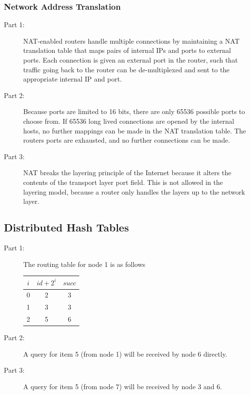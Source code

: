 \subsubsection{Network Address Translation}
\begin{description}
    \item[Part 1:] NAT-enabled routers handle multiple connections by maintaining a NAT translation
        table that maps pairs of internal IPs and ports to external ports. Each connection is given
        an external port in the router, such that traffic going back to the router can be de-multiplexed
        and sent to the appropriate internal IP and port.
    \item[Part 2:] Because ports are limited to 16 bits, there are only 65536 possible ports to choose from.
        If 65536 long lived connections are opened by the internal hosts, no further mappings can be made in
        the NAT translation table. The routers ports are exhausted, and no further connections can be made.
    \item[Part 3:] NAT breaks the layering principle of the Internet because it alters the contents of the
        transport layer port field. This is not allowed in the layering model, because a router only handles
        the layers up to the network layer.
\end{description}

\subsection{Distributed Hash Tables}
\begin{description}
    \item[Part 1:] The routing table for node 1 is as follows\\
        \begin{tabular}{|c|c|c|}
            \hline
            $i$ & $id + 2^{i}$ & $succ$ \\ \hline
            0 & 2 & 3 \\ \hline
            1 & 3 & 3 \\ \hline
            2 & 5 & 6 \\
            \hline
        \end{tabular}

    \item[Part 2:] A query for item 5 (from node 1) will be received by node 6 directly.
    \item[Part 3:] A query for item 5 (from node 7) will be received by node 3 and 6.
\end{description}

